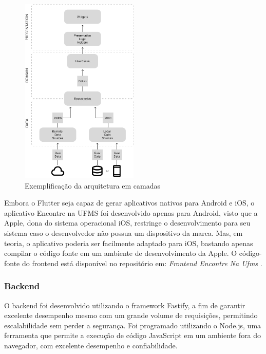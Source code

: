     \begin{figure}[h]
        \centering
        \includegraphics[width=0.5\textwidth]{imagens/cleanarch.png}
        \caption{\scriptsize Exemplificação da arquitetura em camadas}
        \footnotesize  {}
        \label{fig:clean-architecture}
    \end{figure}

    \FloatBarrier

    Embora o Flutter seja capaz de gerar aplicativos nativos para Android e iOS, o aplicativo Encontre na UFMS foi desenvolvido apenas para Android, visto que a Apple, dona do sistema operacional iOS, restringe o desenvolvimento para seu sistema caso o desenvolvedor não possua um dispositivo da marca. Mas, em teoria, o aplicativo poderia ser facilmente adaptado para iOS, bastando apenas compilar o código fonte em um ambiente de desenvolvimento da Apple. O código-fonte do frontend está disponível no repositório em: \textit{Frontend Encontre Na Ufms} \cite{frontend}.

\subsubsection{Backend}

    O backend foi desenvolvido utilizando o framework Fastify, a fim de garantir excelente desempenho mesmo com um grande volume de requisições, permitindo escalabilidade sem perder a segurança. Foi programado utilizando o Node.js, uma ferramenta que permite a execução de código JavaScript em um ambiente fora do navegador, com excelente desempenho e confiabilidade. 
    
